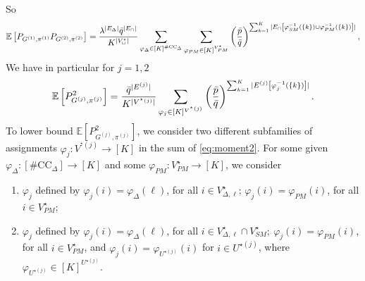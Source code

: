 \documentclass[final]{colt2026}
\newcommand{\1}{\mathbf{1}}
\newcommand{\bbE}{\mathbb{E}}
\newcommand{\pa}[1]{\left(#1\right)}
\newcommand{\ac}[1]{\left\{#1\right\}}
\newcommand{\cro}[1]{\left[#1\right]}
\begin{document}
So
\begin{equation}\label{eq:cross:formula}
   \bbE\cro{P_{G^{(1)}, \pi^{(1)}}P_{G^{(2)}, \pi^{(2)}}} = {\lambda^{|E_{\Delta}|} \bar q^{|E_{\cap}|}\over K^{|V^{\star}_{\cup}|}} \sum_{\varphi_{\Delta}\in [K]^{\#\mathrm{CC}_{\Delta}}} \sum_{\varphi_{PM}\in [K]^{V^{\star}_{PM}}}  \pa{\bar p\over \bar q}^{\sum_{k=1}^K|E_{\cap}\cro{\varphi_{SM}^{-1}(\ac{k})\cup\varphi_{PM}^{-1}(\ac{k})}|},
\end{equation}
We have in particular for $j=1,2$
\begin{equation}\label{eq:moment2}
\bbE\cro{P_{G^{(j)}, \pi^{(j)}}^2} =   {\bar q^{|E^{(j)}|}\over K^{|V^{^{\star}(j)}|}} \sum_{\varphi_{j}\in [K]^{V^{^{\star}(j)}}}  \pa{\bar p\over \bar q}^{\sum_{k=1}^K|E^{(j)}\cro{\varphi_{j}^{-1}(\ac{k})}|}.
\end{equation}
To lower bound $\bbE[P_{G^{(j)}, \pi^{(j)}}^2]$, we consider two different subfamilies of assignments $\varphi_{j}:V^{^{\star}(j)}\to[K]$ in the sum of \eqref{eq:moment2}. For some given $\varphi_{\Delta}:[\#\mathrm{CC}_{\Delta}]\to[K]$ and some $\varphi_{PM}:V^{\star}_{PM}\to [K]$, we consider
\begin{enumerate}
\item $\varphi_{j}$ defined by $\varphi_j(i)=\varphi_{\Delta}(\ell)$, for all $i\in V^{\star}_{\Delta,\ell}$; $\varphi_j(i)=\varphi_{PM}(i)$, for all $i\in V^{\star}_{PM}$;
\item $\varphi_{j}$ defined by $\varphi_j(i)=\varphi_{\Delta}(\ell)$, for all $i\in V^{\star}_{\Delta,\ell}\cap V^{\star}_{SM};\ \varphi_j(i)=\varphi_{PM}(i)$, for all $i\in V^{\star}_{PM}$, and $\varphi_j(i)=\varphi_{U^{\star(j)}}(i)$ for $i\in U^{\star(j)}$, where $\varphi_{U^{\star(j)}}\in [K]^{U^{\star(j)}}$.
\end{enumerate}
\end{document}
